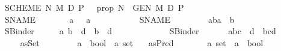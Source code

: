 \begin{isabellebody}
\ \ {\isachardoublequoteopen}{\isacharunderscore}SCHEME{}\ N\ M\ D\ P{\isachardoublequoteclose}\ \ {\isacharequal}{\isacharequal}\ {\isacharparenleft}{\isachardoublequoteopen}prop{\isachardoublequoteclose}{\isacharparenright}\ {\isachardoublequoteopen}N\ {\isacharequal}{\isacharequal}\ {\isacharparenleft}{\isacharunderscore}GEN{}\ M\ D\ P{\isacharparenright}{\isachardoublequoteclose}%
\isamarkuptrue%
\isamarkupfalse%
\isanewline
\isanewline
\ \ SNAME{}\ \ \ \ \ \ \ {\isacharcolon}{\isacharcolon}\ {\isachardoublequoteopen}{\isacharprime}a\ \ {\isacharequal}{\isachargreater}\ {\isacharprime}a{\isachardoublequoteclose}\ \ \ \ \ \ \ \ \ \isanewline
\ \ SNAME\ \ \ \ \ \ \ \ {\isacharcolon}{\isacharcolon}\ {\isachardoublequoteopen}{\isacharbrackleft}{\isacharprime}a{\isacharequal}{\isachargreater}{\isacharprime}b{\isacharcomma}{\isacharprime}a{\isacharbrackright}\ {\isacharequal}{\isachargreater}\ {\isacharprime}b{\isachardoublequoteclose}\ \isanewline
\ \ SBinder{}\ \ \ \ \ {\isacharcolon}{\isacharcolon}\ {\isachardoublequoteopen}{\isacharbrackleft}{\isacharprime}a{\isacharcomma}\ {\isacharprime}b\ {\isacharequal}{\isachargreater}\ {\isacharprime}d{\isacharbrackright}\ {\isacharequal}{\isachargreater}\ {\isacharparenleft}{\isacharprime}b\ {\isacharequal}{\isachargreater}\ {\isacharprime}d{\isacharparenright}{\isachardoublequoteclose}\ \ \ \ \ \ \ \ \ \ \ \isanewline
\ \ SBinder\ \ \ \ \ \ {\isacharcolon}{\isacharcolon}\ {\isachardoublequoteopen}{\isacharbrackleft}{\isacharprime}a{\isacharcomma}{\isacharbrackleft}{\isacharprime}b{\isacharcomma}{\isacharprime}c{\isacharbrackright}\ {\isacharequal}{\isachargreater}\ {\isacharprime}d{\isacharbrackright}\ {\isacharequal}{\isachargreater}\ {\isacharparenleft}{\isacharparenleft}{\isacharprime}b{\isacharasterisk}{\isacharprime}c{\isacharparenright}{\isacharequal}{\isachargreater}{\isacharprime}d{\isacharparenright}{\isachardoublequoteclose}\ \isanewline
\ \ \isanewline
\ \ \ \isanewline
\ \ asSet\ \ \ \ \ \ \ \ {\isacharcolon}{\isacharcolon}\ {\isachardoublequoteopen}{\isacharbrackleft}{\isacharprime}a\ {\isacharequal}{\isachargreater}\ bool{\isacharbrackright}\ {\isacharequal}{\isachargreater}\ {\isacharprime}a\ set{\isachardoublequoteclose}\ \isanewline
\ \ asPred\ \ \ \ \ \ \ {\isacharcolon}{\isacharcolon}\ {\isachardoublequoteopen}{\isacharbrackleft}{\isacharprime}a\ set{\isacharbrackright}\ {\isacharequal}{\isachargreater}\ {\isacharprime}a\ {\isacharequal}{\isachargreater}\ bool{\isachardoublequoteclose}\ \isanewline

\end{isabellebody}
